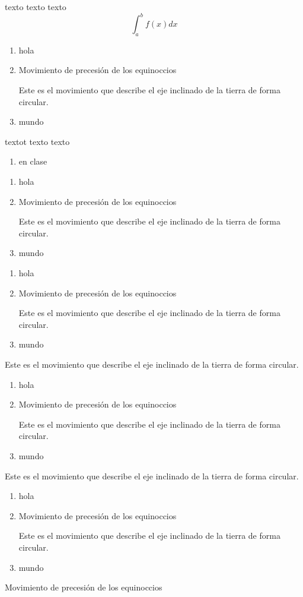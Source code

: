 \documentclass{report}
\begin{document}
texto texto texto	
$$
\int_a^b f(x)dx
$$

\begin{enumerate}[start=101,label=\textbf{\Roman*)}]
	\item hola
	\item Movimiento de precesión de los equinoccios
	
	Este es el movimiento que describe el eje inclinado de la tierra de forma circular.
	\item mundo
\end{enumerate}

textot texto texto

\begin{enumerate}[resume*]
	\item en clase
\end{enumerate}
	
\begin{enumerate}[label=\fbox{\roman*}]
	\item hola
	\item Movimiento de precesión de los equinoccios
	
	Este es el movimiento que describe el eje inclinado de la tierra de forma circular.
	\item mundo
\end{enumerate}
	
\begin{enumerate}[label=\alph*)]
	\item hola
	\item Movimiento de precesión de los equinoccios
	
	Este es el movimiento que describe el eje inclinado de la tierra de forma circular.
	\item mundo
\end{enumerate}	
	
	
	
Este es el movimiento que describe el eje inclinado de la tierra de forma circular.	
\begin{enumerate}[labelsep=*]
	\item hola
	\item Movimiento de precesión de los equinoccios
	
	Este es el movimiento que describe el eje inclinado de la tierra de forma circular.
	\item mundo
\end{enumerate}	
Este es el movimiento que describe el eje inclinado de la tierra de forma circular.
\begin{enumerate}[leftmargin=*]
	\item hola
	\item Movimiento de precesión de los equinoccios
	
	Este es el movimiento que describe el eje inclinado de la tierra de forma circular.
	\item mundo
\end{enumerate}	
Movimiento de precesión de los equinoccios
\end{document}
